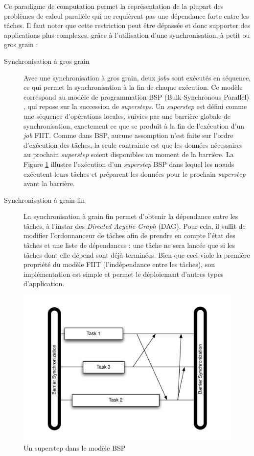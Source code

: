 Ce paradigme de computation permet la représentation de la plupart des problèmes de calcul parallèle qui ne requièrent pas une dépendance forte entre les tâches. Il faut noter que cette restriction peut être dépassée et donc supporter des applications plus complexes, grâce à l'utilisation d'une synchronisation, à petit ou gros grain :

\begin{description}
\item [Synchronisation à gros grain] Avec une synchronisation à gros grain, deux \textit{jobs} sont exécutés en séquence, ce qui permet la synchronisation à la fin de chaque exécution. Ce modèle correspond au modèle de programmation BSP (Bulk-Synchronous Parallel) \cite{Valiant90}, qui repose sur la succession de \textit{supersteps}. Un \textit{superstep} est défini comme une séquence d'opérations locales, suivies par une barrière globale de synchronisation, exactement ce que se produit à la fin de l'exécution d'un \textit{job} FIIT. Comme dans BSP, aucune assomption n'est faite sur l'ordre d'exécution des tâches, la seule contrainte est que les données nécessaires au prochain \textit{superstep} soient disponibles au moment de la barrière. La Figure \ref{fig:Superstep}  illustre l'exécution d'un \textit{superstep} BSP dans lequel les n{\oe}uds exécutent leurs tâches et préparent les données pour le prochain \textit{superstep} avant la barrière.

\item [Synchronisation à grain fin] La synchronisation à grain fin permet d'obtenir la dépendance entre les tâches, à l'instar des \textit{Directed Acyclic Graph} (DAG). Pour cela, il suffit de modifier l'ordonnanceur de tâches afin de prendre en compte l'état des tâches et une liste de dépendances : une tâche ne sera lancée que si les tâches dont elle dépend sont déjà terminées. Bien que ceci viole la première propriété du modèle FIIT (l'indépendance entre les tâches), son implémentation est simple et permet le déploiement d'autres types d'application.
\end{description}


\begin{figure}
	\centering
		\includegraphics[width=0.5\linewidth]{img/BSP}
		\caption{Un superstep dans le modèle BSP}\label{fig:Superstep}
\end{figure}

